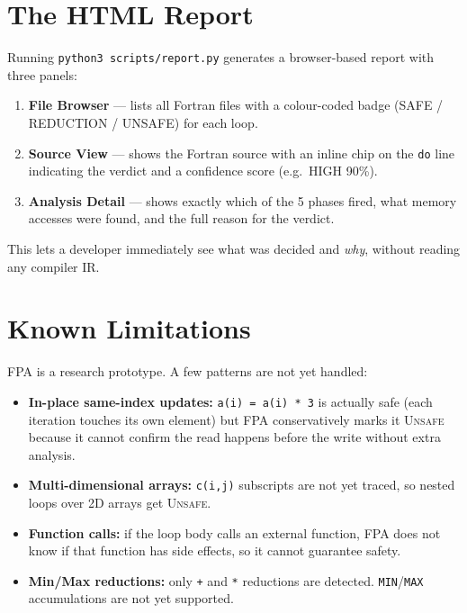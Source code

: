 \documentclass[12pt,a4paper]{article}
\begin{document}
\section{The HTML Report}

Running \texttt{python3 scripts/report.py} generates a browser-based
report with three panels:

\begin{enumerate}[leftmargin=1.5em]
  \item \textbf{File Browser} --- lists all Fortran files with a
        colour-coded badge (\textcolor{safegreen}{SAFE} /
        \textcolor{reducegold}{REDUCTION} /
        \textcolor{unsafered}{UNSAFE}) for each loop.
  \item \textbf{Source View} --- shows the Fortran source with an
        inline chip on the \texttt{do} line indicating the verdict
        and a confidence score (e.g.\ HIGH 90\%).
  \item \textbf{Analysis Detail} --- shows exactly which of the 5
        phases fired, what memory accesses were found, and the full
        reason for the verdict.
\end{enumerate}

This lets a developer immediately see what was decided and \textit{why},
without reading any compiler IR.

\section{Known Limitations}

FPA is a research prototype. A few patterns are not yet handled:

\begin{itemize}[leftmargin=1.5em, itemsep=4pt]
  \item \textbf{In-place same-index updates:} \texttt{a(i) = a(i) * 3}
        is actually safe (each iteration touches its own element) but
        FPA conservatively marks it \textsc{Unsafe} because it cannot
        confirm the read happens before the write without extra
        analysis.

  \item \textbf{Multi-dimensional arrays:} \texttt{c(i,j)} subscripts
        are not yet traced, so nested loops over 2D arrays get
        \textsc{Unsafe}.

  \item \textbf{Function calls:} if the loop body calls an external
        function, FPA does not know if that function has side effects,
        so it cannot guarantee safety.

  \item \textbf{Min/Max reductions:} only \texttt{+} and \texttt{*}
        reductions are detected. \texttt{MIN}/\texttt{MAX}
        accumulations are not yet supported.
\end{itemize}
\end{document}
